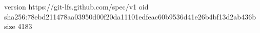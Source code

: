 version https://git-lfs.github.com/spec/v1
oid sha256:78ebd211478aa03950d00f20da11101edfeac60b9536d41e26b4bf13d2ab436b
size 4183
